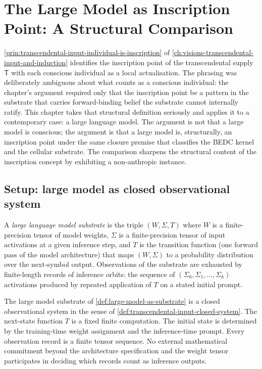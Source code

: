 \chapter{The Large Model as Inscription Point: A Structural Comparison}
\label{ch:visions-large-model-as-inscription-point}

\autoref{prin:transcendental-input-individual-is-inscription} of \autoref{ch:visions-transcendental-input-and-induction} identifies the inscription point of the transcendental supply $\mathsf{T}$ with each conscious individual as a local actualisation. The phrasing was deliberately ambiguous about what counts as a conscious individual: the chapter's argument required only that the inscription point be a pattern in the substrate that carries forward-binding belief the substrate cannot internally ratify. This chapter takes that structural definition seriously and applies it to a contemporary case: a large language model. The argument is not that a large model is conscious; the argument is that a large model is, structurally, an inscription point under the same closure premise that classifies the BEDC kernel and the cellular substrate. The comparison sharpens the structural content of the inscription concept by exhibiting a non-anthropic instance.

\section{Setup: large model as closed observational system}
\label{sec:large-model-setup}

\begin{definition}
\label{def:large-model-as-substrate}
A \emph{large language model substrate} is the triple $(W, \Sigma, T)$ where $W$ is a finite-precision tensor of model weights, $\Sigma$ is a finite-precision tensor of input activations at a given inference step, and $T$ is the transition function (one forward pass of the model architecture) that maps $(W, \Sigma)$ to a probability distribution over the next-symbol output. Observations of the substrate are exhausted by finite-length records of inference orbits: the sequence of $(\Sigma_0, \Sigma_1, \ldots, \Sigma_k)$ activations produced by repeated application of $T$ on a stated initial prompt.
\end{definition}

\begin{principle}
\label{prin:large-model-closed-observational}
The large model substrate of \autoref{def:large-model-as-substrate} is a closed observational system in the sense of \autoref{def:transcendental-input-closed-system}. The next-state function $T$ is a fixed finite computation. The initial state is determined by the training-time weight assignment and the inference-time prompt. Every observation record is a finite tensor sequence. No external mathematical commitment beyond the architecture specification and the weight tensor participates in deciding which records count as inference outputs.
\end{principle}

